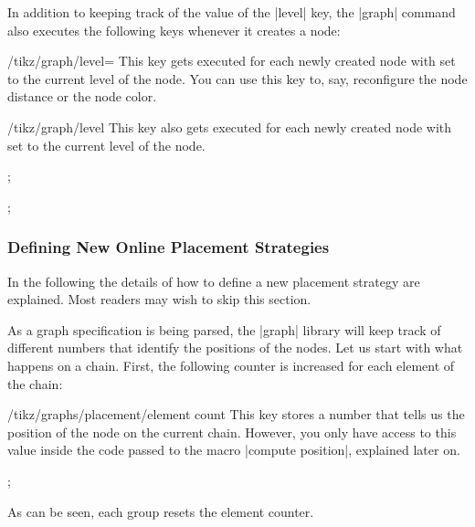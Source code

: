 In addition to keeping track of the value of the |level| key, the |graph|
command also executes the following keys whenever it creates a node:

\begin{stylekey}{/tikz/graph/level=}
    This key gets executed for each newly created node with  set to
    the current level of the node. You can use this key to, say, reconfigure
    the node distance or the node color.
\end{stylekey}

\begin{stylekey}{/tikz/graph/level }
    This key also gets executed for each newly created node with 
    set to the current level of the node.
\begin{codeexample}[]
\tikz {};
\end{codeexample}
\begin{codeexample}[]
\tikz {};
\end{codeexample}
\end{stylekey}


\subsubsection{Defining New Online Placement Strategies}
\label{section-library-graphs-new-online}

In the following the details of how to define a new placement strategy are
explained. Most readers may wish to skip this section.

As a graph specification is being parsed, the |graph| library will keep track
of different numbers that identify the positions of the nodes. Let us start
with what happens on a chain. First, the following counter is increased for
each element of the chain:
%
\begin{key}{/tikz/graphs/placement/element count}
    This key stores a number that tells us the position of the node on the
    current chain. However, you only have access to this value inside the code
    passed to the macro |compute position|, explained later on.
\begin{codeexample}[]
\tikz {};
\end{codeexample}
    As can be seen, each group resets the element counter.
\end{key}

